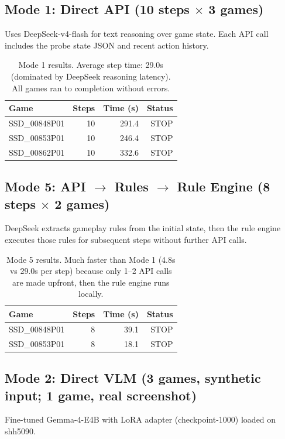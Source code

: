 \documentclass[11pt,a4paper]{article}
\begin{document}
\subsection{Mode 1: Direct API (10 steps $\times$ 3 games)}
Uses DeepSeek-v4-flash for text reasoning over game state. Each API call includes the 
probe state JSON and recent action history.

\begin{table}[H]
\centering
\begin{tabular}{lrrr}
\toprule
Game & Steps & Time (s) & Status \\
\midrule
SSD\_00848P01 & 10 & 291.4 & STOP \\
SSD\_00853P01 & 10 & 246.4 & STOP \\
SSD\_00862P01 & 10 & 332.6 & STOP \\
\bottomrule
\end{tabular}
\caption{Mode 1 results. Average step time: 29.0s (dominated by DeepSeek reasoning latency). 
All games ran to completion without errors.}
\end{table}

\subsection{Mode 5: API $\to$ Rules $\to$ Rule Engine (8 steps $\times$ 2 games)}
DeepSeek extracts gameplay rules from the initial state, then the rule engine executes 
those rules for subsequent steps without further API calls.

\begin{table}[H]
\centering
\begin{tabular}{lrrr}
\toprule
Game & Steps & Time (s) & Status \\
\midrule
SSD\_00848P01 & 8 & 39.1 & STOP \\
SSD\_00853P01 & 8 & 18.1 & STOP \\
\bottomrule
\end{tabular}
\caption{Mode 5 results. Much faster than Mode 1 (4.8s vs 29.0s per step) because 
only 1--2 API calls are made upfront, then the rule engine runs locally.}
\end{table}

\subsection{Mode 2: Direct VLM (3 games, synthetic input; 1 game, real screenshot)}
Fine-tuned Gemma-4-E4B with LoRA adapter (checkpoint-1000) loaded on shh5090.
\end{document}
